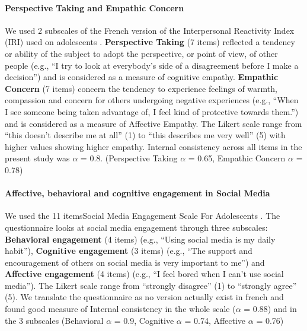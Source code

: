\documentclass[preprint, 3p,
authoryear]{elsarticle} %
\begin{document}
\hypertarget{perspective-taking-and-empathic-concern}{%
\paragraph{Perspective Taking and Empathic
Concern}\label{perspective-taking-and-empathic-concern}}

We used 2 subscales of the French version \citep{gilet_assessing_2013}
of the Interpersonal Reactivity Index (IRI)
\citep{davis_interpersonal_1980} used on adolescents
\citep{hawk_examining_2013}. \textbf{Perspective Taking} (7 items)
reflected a tendency or ability of the subject to adopt the perspective,
or point of view, of other people (e.g., ``I try to look at everybody's
side of a disagreement before I make a decision'') and is considered as
a measure of cognitive empathy. \textbf{Empathic Concern} (7 items)
concern the tendency to experience feelings of warmth, compassion and
concern for others undergoing negative experiences (e.g., ``When I see
someone being taken advantage of, I feel kind of protective towards
them.'') and is considered as a measure of Affective Empathy. The Likert
scale range from ``this doesn't describe me at all'' (1) to ``this
describes me very well'' (5) with higher values showing higher empathy.
Internal consistency across all items in the present study was
\(\alpha\) = 0.8. (Perspective Taking \(\alpha\) = 0.65, Empathic
Concern \(\alpha\) = 0.78)

\hypertarget{affective-behavioral-and-cognitive-engagement-in-social-media}{%
\paragraph{Affective, behavioral and cognitive engagement in Social
Media}\label{affective-behavioral-and-cognitive-engagement-in-social-media}}

We used the 11 itemsSocial Media Engagement Scale For Adolescents
\citep{ni_development_2020}. The questionnaire looks at social media
engagement through three subscales: \textbf{Behavioral engagement} (4
items) (e.g., ``Using social media is my daily habit''),
\textbf{Cognitive engagement} (3 items) (e.g., ``The support and
encouragement of others on social media is very important to me'') and
\textbf{Affective engagement} (4 items) (e.g., ``I feel bored when I
can't use social media''). The Likert scale range from ``strongly
disagree'' (1) to ``strongly agree'' (5). We translate the questionnaire
as no version actually exist in french and found good measure of
Internal consistency in the whole scale (\(\alpha\) = 0.88) and in the 3
subscales (Behavioral \(\alpha\) = 0.9, Cognitive \(\alpha\) = 0.74,
Affective \(\alpha\) = 0.76)
\end{document}
